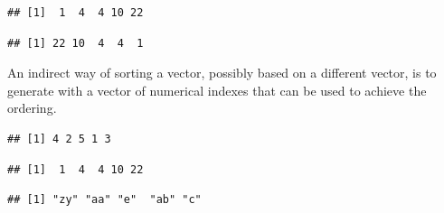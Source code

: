 \documentclass[krantz2]{krantz}\usepackage{knitr}
\begin{document}
\begin{knitrout}\footnotesize
{}\color{fgcolor}\begin{kframe}
\begin{alltt}
 \hlkwb{<-} \hlstd{(}\hlstd{,} \hlstd{,} \hlstd{,} \hlstd{,} \hlstd{)}
\end{alltt}
\begin{verbatim}
## [1]  1  4  4 10 22
\end{verbatim}
\begin{alltt}
  \hlstd{=} \hlstd{)}
\end{alltt}
\begin{verbatim}
## [1] 22 10  4  4  1
\end{verbatim}
\end{kframe}
\end{knitrout}

An indirect way of sorting a vector, possibly based on a different vector, is to generate with  a vector of numerical indexes that can be used to achieve the ordering.

\begin{knitrout}\footnotesize
{}\color{fgcolor}\begin{kframe}
\begin{alltt}
\end{alltt}
\begin{verbatim}
## [1] 4 2 5 1 3
\end{verbatim}
\begin{alltt}
\hlstd{my.vector[}\hlstd{(my.vector)]}
\end{alltt}
\begin{verbatim}
## [1]  1  4  4 10 22
\end{verbatim}
\begin{alltt}
 \hlkwb{<-} \hlstd{(}\hlstd{,} \hlstd{,} \hlstd{,} \hlstd{,} \hlstd{)}
\hlstd{another.vector[}\hlstd{(my.vector)]}
\end{alltt}
\begin{verbatim}
## [1] "zy" "aa" "e"  "ab" "c"
\end{verbatim}
\end{kframe}
\end{knitrout}
\end{document}
